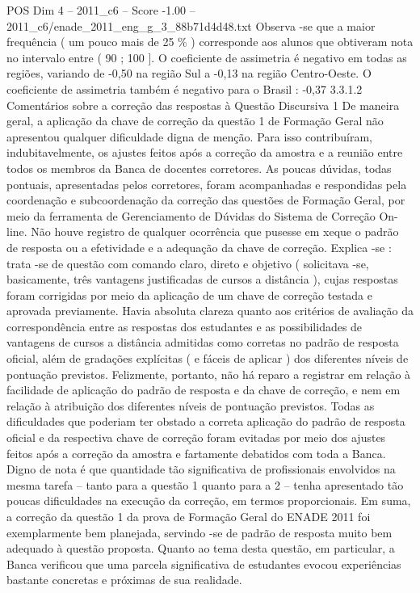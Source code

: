 \begin{textsample}{POS Dim 4 – 2011\_c6 – Score -1.00 – 2011\_c6/enade\_2011\_eng\_g\_3\_88b71d4d48.txt}
Observa -se que a maior frequência ( um pouco mais de 25 \% ) corresponde aos alunos que obtiveram nota no intervalo entre ( 90 ; 100 ].
O coeficiente de assimetria é negativo em todas as regiões, variando de -0,50 na região Sul a -0,13 na região Centro-Oeste.
O coeficiente de assimetria também é negativo para o Brasil : -0,37 3.3.1.2 Comentários sobre a correção das respostas à Questão Discursiva 1 De maneira geral, a aplicação da chave de correção da questão 1 de Formação Geral não apresentou qualquer dificuldade digna de menção.
Para isso contribuíram, indubitavelmente, os ajustes feitos após a correção da amostra e a reunião entre todos os membros da Banca de docentes corretores.
As poucas dúvidas, todas pontuais, apresentadas pelos corretores, foram acompanhadas e respondidas pela coordenação e subcoordenação da correção das questões de Formação Geral, por meio da ferramenta de Gerenciamento de Dúvidas do Sistema de Correção On-line.
Não houve registro de qualquer ocorrência que pusesse em xeque o padrão de resposta ou a efetividade e a adequação da chave de correção.
Explica -se : trata -se de questão com comando claro, direto e objetivo ( solicitava -se, basicamente, três vantagens justificadas de cursos a distância ), cujas respostas foram corrigidas por meio da aplicação de um chave de correção testada e aprovada previamente.
Havia absoluta clareza quanto aos critérios de avaliação da correspondência entre as respostas dos estudantes e as possibilidades de vantagens de cursos a distância admitidas como corretas no padrão de resposta oficial, além de gradações explícitas ( e fáceis de aplicar ) dos diferentes níveis de pontuação previstos.
Felizmente, portanto, não há reparo a registrar em relação à facilidade de aplicação do padrão de resposta e da chave de correção, e nem em relação à atribuição dos diferentes níveis de pontuação previstos.
Todas as dificuldades que poderiam ter obstado a correta aplicação do padrão de resposta oficial e da respectiva chave de correção foram evitadas por meio dos ajustes feitos após a correção da amostra e fartamente debatidos com toda a Banca.
Digno de nota é que quantidade tão significativa de profissionais envolvidos na mesma tarefa – tanto para a questão 1 quanto para a 2 – tenha apresentado tão poucas dificuldades na execução da correção, em termos proporcionais.
Em suma, a correção da questão 1 da prova de Formação Geral do ENADE 2011 foi exemplarmente bem planejada, servindo -se de padrão de resposta muito bem adequado à questão proposta.
Quanto ao tema desta questão, em particular, a Banca verificou que uma parcela significativa de estudantes evocou experiências bastante concretas e próximas de sua realidade.

\end{textsample}
